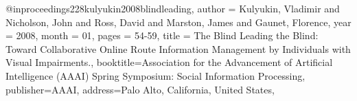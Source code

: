 @inproceedings{228kulyukin2008blindleading,
author = {Kulyukin, Vladimir and Nicholson, John and Ross, David and Marston, James and Gaunet, Florence},
year = {2008},
month = {01},
pages = {54-59},
title = {The Blind Leading the Blind: Toward Collaborative Online Route Information Management by Individuals with Visual Impairments.},
booktitle={Association for the Advancement of Artificial Intelligence (AAAI) Spring Symposium: Social Information Processing},
publisher={AAAI},
address={Palo Alto, California, United States},
}